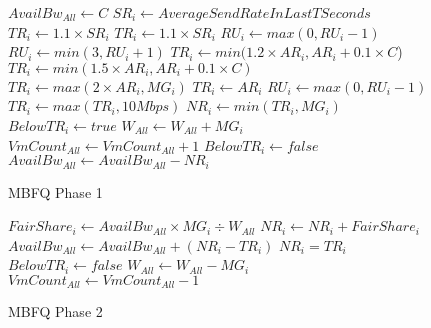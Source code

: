 \begin{figure}[t]
{\footnotesize
\begin{algorithmic}[1]
\State $AvailBw_{All} \gets C$
\State $SR_{i} \gets AverageSendRateInLastTSeconds$
\State $TR_{i} \gets 1.1 \times SR_{i}$
\State $TR_{i} \gets 1.1 \times SR_{i}$ 
\State $RU_{i} \gets max(0, RU_{i}-1)$
\State $RU_{i} \gets min(3, RU_{i} + 1)$
\State $TR_{i} \gets min(1.2 \times AR_{i}, AR_{i} + 0.1 \times C$)
\State $TR_{i} \gets min(1.5 \times AR_{i}, AR_{i} + 0.1 \times C)$
\State $TR_{i} \gets max(2 \times AR_{i}, MG_{i})$
\EndIf
\Else
\State $TR_{i} \gets AR_{i}$
\State $RU_{i} \gets max(0, RU_{i} - 1)$
\EndIf
\\
\State $TR_{i} \gets max(TR_{i}, 10Mbps)$
\State $NR_{i} \gets min(TR_{i}, MG_{i})$
\\
\State $BelowTR_{i} \gets true$
\State $W_{All} \gets W_{All} + MG_{i}$
\State $VmCount_{All} \gets VmCount_{All} + 1$
\Else
\State $BelowTR_{i} \gets false$
\EndIf
\\
\State $AvailBw_{All} \gets AvailBw_{All} - NR_{i}$
\EndFor
\end{algorithmic}
}
\vspace{-0.5em}
\caption{MBFQ Phase 1}
\label{fig:mbfq_p1}
\vspace{-2em}
\end{figure}

\begin{figure}[t]
{\footnotesize
\begin{algorithmic}[1]
\State $FairShare_{i} \gets AvailBw_{All} \times MG_{i} \div W_{All}$
\State $NR_{i} \gets NR_{i} + FairShare_{i}$
\EndIf
\\
\State $AvailBw_{All} \gets AvailBw_{All} + (NR_{i} - TR_{i})$
\State $NR_{i} = TR_{i}$
\State $BelowTR_{i} \gets false$
\State $W_{All} \gets W_{All} - MG_{i}$
\State $VmCount_{All} \gets VmCount_{All} - 1$
\EndIf
\EndFor
\EndWhile
\end{algorithmic}
}
\vspace{-0.5em}
\caption{MBFQ Phase 2}
\label{fig:mbfq_p2}
\vspace{-1em}
\end{figure}

